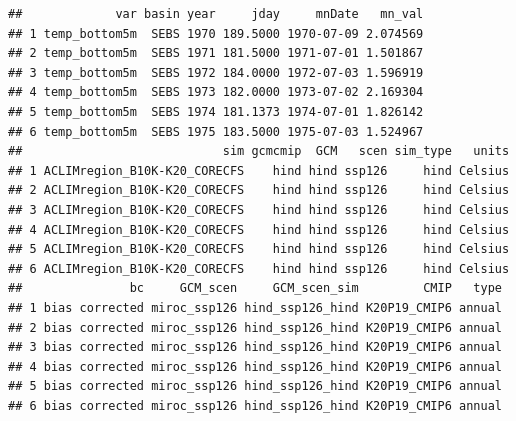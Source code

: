 \documentclass[
]{article}
\newenvironment{Shaded}{\begin{snugshade}}{\end{snugshade}}
\newcommand{\AttributeTok}[1]{\textcolor[rgb]{0.77,0.63,0.00}{#1}}
\newcommand{\CommentTok}[1]{\textcolor[rgb]{0.56,0.35,0.01}{\textit{#1}}}
\newcommand{\DecValTok}[1]{\textcolor[rgb]{0.00,0.00,0.81}{#1}}
\newcommand{\FunctionTok}[1]{\textcolor[rgb]{0.00,0.00,0.00}{#1}}
\newcommand{\NormalTok}[1]{#1}
\newcommand{\OtherTok}[1]{\textcolor[rgb]{0.56,0.35,0.01}{#1}}
\newcommand{\SpecialCharTok}[1]{\textcolor[rgb]{0.00,0.00,0.00}{#1}}
\newcommand{\StringTok}[1]{\textcolor[rgb]{0.31,0.60,0.02}{#1}}
\begin{document}
\begin{Shaded}
\end{Shaded}

\begin{Shaded}
\end{Shaded}

\begin{verbatim}
##             var basin year     jday     mnDate   mn_val
## 1 temp_bottom5m  SEBS 1970 189.5000 1970-07-09 2.074569
## 2 temp_bottom5m  SEBS 1971 181.5000 1971-07-01 1.501867
## 3 temp_bottom5m  SEBS 1972 184.0000 1972-07-03 1.596919
## 4 temp_bottom5m  SEBS 1973 182.0000 1973-07-02 2.169304
## 5 temp_bottom5m  SEBS 1974 181.1373 1974-07-01 1.826142
## 6 temp_bottom5m  SEBS 1975 183.5000 1975-07-03 1.524967
##                            sim gcmcmip  GCM   scen sim_type   units
## 1 ACLIMregion_B10K-K20_CORECFS    hind hind ssp126     hind Celsius
## 2 ACLIMregion_B10K-K20_CORECFS    hind hind ssp126     hind Celsius
## 3 ACLIMregion_B10K-K20_CORECFS    hind hind ssp126     hind Celsius
## 4 ACLIMregion_B10K-K20_CORECFS    hind hind ssp126     hind Celsius
## 5 ACLIMregion_B10K-K20_CORECFS    hind hind ssp126     hind Celsius
## 6 ACLIMregion_B10K-K20_CORECFS    hind hind ssp126     hind Celsius
##               bc     GCM_scen     GCM_scen_sim         CMIP   type
## 1 bias corrected miroc_ssp126 hind_ssp126_hind K20P19_CMIP6 annual
## 2 bias corrected miroc_ssp126 hind_ssp126_hind K20P19_CMIP6 annual
## 3 bias corrected miroc_ssp126 hind_ssp126_hind K20P19_CMIP6 annual
## 4 bias corrected miroc_ssp126 hind_ssp126_hind K20P19_CMIP6 annual
## 5 bias corrected miroc_ssp126 hind_ssp126_hind K20P19_CMIP6 annual
## 6 bias corrected miroc_ssp126 hind_ssp126_hind K20P19_CMIP6 annual
\end{verbatim}
\end{document}
